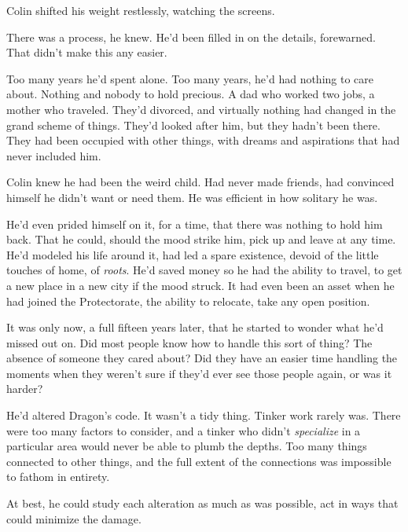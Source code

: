 \blacksquare



Colin shifted his weight restlessly, watching the screens.



There was a process, he knew.  He'd been filled in on the details, forewarned.  That didn't make this any easier.



Too many years he'd spent alone.  Too many years, he'd had nothing to care about.  Nothing and nobody to hold precious.  A dad who worked two jobs, a mother who traveled.  They'd divorced, and virtually nothing had changed in the grand scheme of things.  They'd looked after him, but they hadn't been there.  They had been occupied with other things, with dreams and aspirations that had never included him.



Colin knew he had been the weird child.  Had never made friends, had convinced himself he didn't want or need them.  He was efficient in how solitary he was.



He'd even prided himself on it, for a time, that there was nothing to hold him back.  That he could, should the mood strike him, pick up and leave at any time.  He'd modeled his life around it, had led a spare existence, devoid of the little touches of home, of \emph{roots}.  He'd saved money so he had the ability to travel, to get a new place in a new city if the mood struck.  It had even been an asset when he had joined the Protectorate, the ability to relocate, take any open position.



It was only now, a full fifteen years later, that he started to wonder what he'd missed out on.  Did most people know how to handle this sort of thing?  The absence of someone they cared about?  Did they have an easier time handling the moments when they weren't sure if they'd ever see those people again, or was it harder?



He'd altered Dragon's code.  It wasn't a tidy thing.  Tinker work rarely was.  There were too many factors to consider, and a tinker who didn't \emph{specialize} in a particular area would never be able to plumb the depths.  Too many things connected to other things, and the full extent of the connections was impossible to fathom in entirety.



At best, he could study each alteration as much as was possible, act in ways that could minimize the damage.



